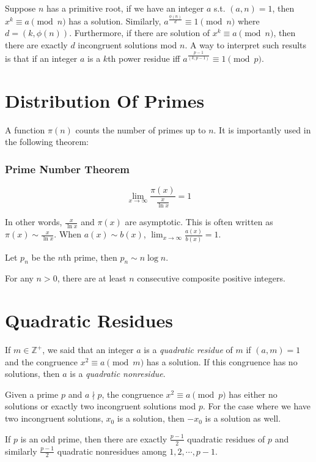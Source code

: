 \documentclass{article}
\begin{document}
\begin{multicols*}{2}
Suppose $n$ has a primitive root, if we have an integer $a$ s.t. $(a,n) = 1$, then $x^k \equiv a \pmod{n}$ has a solution. Similarly, $a^{\frac{\phi(n)}{d}} \equiv 1 \pmod{n}$ where $d = (k, \phi(n))$. Furthermore, if there are solution of $x^k \equiv a \pmod{n}$, then there are exactly $d$ incongruent solutions mod $n$. A way to interpret such results is that if an integer $a$ is a $k$th power residue iff $a^{\frac{p-1}{(k, p-1)}} \equiv 1 \pmod{p}$.

\section{Distribution Of Primes}

A function $\pi(n)$ counts the number of primes up to $n$. It is importantly used in the following theorem:

\subsubsection*{Prime Number Theorem}

\[\lim_{x \rightarrow \infty} \frac{\pi(x)}{\frac{x}{\ln{x}}} = 1\]

In other words, $\frac{x}{\ln{x}}$ and $\pi(x)$ are asymptotic. This is often written as $\pi(x) \sim \frac{x}{\ln{x}}$. When $a(x) \sim b(x)$, $\lim_{x \rightarrow \infty}\frac{a(x)}{b(x)} = 1$.

Let $p_n$ be the $n$th prime, then $p_n \sim n\log{n}$.

For any $n > 0$, there are at least $n$ consecutive composite positive integers.

\section{Quadratic Residues}

If $m \in \mathbb{Z}^+$, we said that an integer $a$ is a \textit{quadratic residue} of $m$ if $(a,m) = 1$ and the congruence $x^2 \equiv a \pmod{m}$ has a solution. If this congruence has no solutions, then $a$ is a \textit{quadratic nonresidue}.

Given a prime $p$ and $a \nmid p$, the congruence $x^2 \equiv a \pmod{p}$ has either no solutions or exactly two incongruent solutions mod $p$. For the case where we have two incongruent solutions, $x_0$ is a solution, then $-x_0$ is a solution as well.

If $p$ is an odd prime, then there are exactly $\frac{p-1}{2}$ quadratic residues of $p$ and similarly $\frac{p-1}{2}$ quadratic nonresidues among $1,2,\cdots,p-1$.


\end{multicols*}
\end{document}
